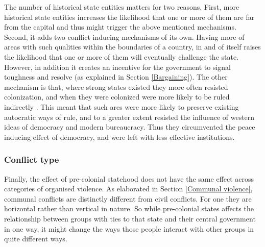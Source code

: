 The number of historical state entities matters for two reasons. First, more
historical state entities increases the likelihood that one or more of them are
far from the capital and thus might trigger the above mentioned mechanisms.
Second, it adds two conflict inducing mechanisms of its own. Having more of
areas with such qualities within the boundaries of a country, in and of itself
raises the likelihood that one or more of them will eventually challenge the
state. However, in addition it creates an incentive for the government to signal
toughness and resolve (as explained in Section \ref{Bargaining}). The other
mechanism is that, where strong states existed they more often resisted
colonization, and when they were colonized were more likely to be ruled
indirectly \citep{Englebert2000, Gerring2011, Hariri2012}. This meant that such
ares were more likely to preserve existing autocratic ways of rule, and to a
greater extent resisted the influence of western ideas of democracy and modern
bureaucracy. Thus they circumvented the peace inducing effect of democracy, and
were left with less effective institutions.

\subsubsection{Conflict type} \label{Conflict type}

Finally, the effect of pre-colonial statehood does not have the same effect
across categories of organised violence. As elaborated in Section \ref{Communal
violence}, communal conflicts are distinctly different from civil conflicts.
For one they are horizontal rather than vertical in nature. So while
pre-colonial states affects the relationship between groups with ties to that
state and their central government in one way, it might change the ways those
people interact with other groups in quite different ways.


